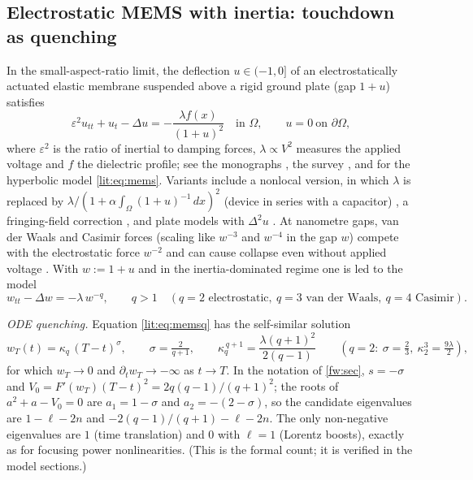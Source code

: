 \subsection{Electrostatic MEMS with inertia: touchdown as quenching}
\label{lit:mems}
In the small-aspect-ratio limit, the deflection $u\in(-1,0]$ of an
electrostatically actuated elastic membrane suspended above a rigid ground
plate (gap $1+u$) satisfies
\begin{equation}\label{lit:eq:mems}
  \varepsilon^{2}u_{tt}+u_t-\Delta u=-\frac{\lambda f(x)}{(1+u)^{2}}
  \quad\text{in }\Omega,\qquad u=0\ \text{on }\partial\Omega,
\end{equation}
where $\varepsilon^2$ is the ratio of inertial to damping forces,
$\lambda\propto V^2$ measures the applied voltage and $f$ the dielectric
profile; see the monographs
\cite{PeleskoBernstein2002,EspositoGhoussoubGuo2010,KavallarisSuzuki2018},
the survey \cite{LaurencotWalker2017}, and
\cite{FloresEtAl2007,Flores2014} for the hyperbolic model
\eqref{lit:eq:mems}. Variants include a nonlocal version, in which $\lambda$
is replaced by $\lambda/(1+\alpha\int_\Omega(1+u)^{-1}\,dx)^{2}$ (device in
series with a capacitor) \cite{KavallarisEtAl2011,KavallarisSuzuki2018}, a
fringing-field correction \cite{Miyasita2017}, and plate models with
$\Delta^2u$ \cite{LaurencotWalker2014,LaurencotWalker2017}. At nanometre
gaps, van der Waals and Casimir forces (scaling like $w^{-3}$ and $w^{-4}$
in the gap $w$) compete with the electrostatic force $w^{-2}$ and can cause
collapse even without applied voltage
\cite{SerryWalliserMaclay1998,BatraPorfiriSpinello2007}. With $w:=1+u$ and
in the inertia-dominated regime one is led to the model
\begin{equation}\label{lit:eq:memsq}
  w_{tt}-\Delta w=-\lambda\,w^{-q},\qquad q>1\quad
  (q=2 \text{ electrostatic},\ q=3 \text{ van der Waals},\ q=4\text{ Casimir}).
\end{equation}

\emph{ODE quenching.} Equation \eqref{lit:eq:memsq} has the self-similar
solution
\begin{equation}\label{lit:eq:memsode}
  w_T(t)=\kappa_q\,(T-t)^{\sigma},\qquad \sigma=\tfrac{2}{q+1},\qquad
  \kappa_q^{\,q+1}=\frac{\lambda(q+1)^{2}}{2(q-1)}
  \qquad(q=2:\ \sigma=\tfrac23,\ \kappa_2^3=\tfrac{9\lambda}{2}),
\end{equation}
for which $w_T\to0$ and $\partial_tw_T\to-\infty$ as $t\to T$. In the
notation of \cref{fw:sec}, $s=-\sigma$ and $V_0=F'(w_T)(T-t)^2=2q(q-1)/(q+1)^2$; the
roots of $a^2+a-V_0=0$ are $a_1=1-\sigma$ and $a_2=-(2-\sigma)$, so the
candidate eigenvalues are $1-\ell-2n$ and $-2(q-1)/(q+1)-\ell-2n$. The only
non-negative eigenvalues are $1$ (time translation) and $0$ with $\ell=1$
(Lorentz boosts), exactly as for focusing power nonlinearities.
(This is the formal count; it is verified in the model sections.)

